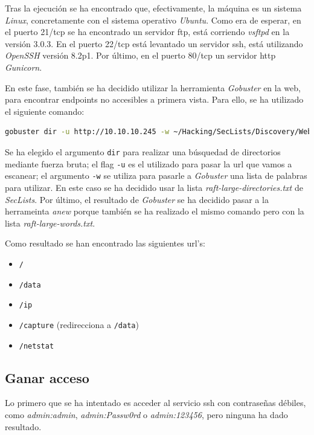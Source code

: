 Tras la ejecución se ha encontrado que, efectivamente, la máquina es un sistema \textit{Linux}, concretamente con el sistema operativo \textit{Ubuntu}. Como era de esperar, en el puerto 21/\acrshort{tcp} se ha encontrado un servidor \acrshort{ftp}, está corriendo \textit{vsftpd}\cite{vsftpd} en la versión 3.0.3. En el puerto 22/\acrshort{tcp} está levantado un servidor \acrshort{ssh}, está utilizando \textit{OpenSSH}\cite{openssh} versión 8.2p1. Por último, en el puerto 80/\acrshort{tcp} un servidor \acrshort{http} \textit{Gunicorn}\cite{gunicorn}.

En este fase, también se ha decidido utilizar la herramienta \textit{Gobuster}\cite{gobuster} en la web, para encontrar endpoints no accesibles a primera vista. Para ello, se ha utilizado el siguiente comando:
\begin{lstlisting}[language=bash]
gobuster dir -u http://10.10.10.245 -w ~/Hacking/SecLists/Discovery/Web-Content/raft-large-directories.txt | anew gobuster.txt
\end{lstlisting}
Se ha elegido el argumento \texttt{dir} para realizar una búsquedad de directorios mediante fuerza bruta; el flag \texttt{-u} es el utilizado para pasar la \acrshort{url} que vamos  a escanear; el argumento \texttt{-w} se utiliza para pasarle a \textit{Gobuster} una lista de palabras para utilizar. En este caso se ha decidido usar la lista \textit{raft-large-directories.txt} de \textit{SecLists}\cite{seclists}. Por último, el resultado de \textit{Gobuster} se ha decidido pasar a la herrameinta \textit{anew}\cite{anew} porque también se ha realizado el mismo comando pero con la lista \textit{raft-large-words.txt}.

Como resultado se han encontrado las siguientes \acrshort{url}'s:
\begin{itemize}
    \item \texttt{/}
    \item \texttt{/data}
    \item \texttt{/ip}
    \item \texttt{/capture} (redirecciona a \texttt{/data})
    \item \texttt{/netstat}
\end{itemize}

\subsection{Ganar acceso}

Lo primero que se ha intentado es acceder al servicio \acrshort{ssh} con contraseñas débiles, como \textit{admin:admin}, \textit{admin:Passw0rd} o \textit{admin:123456}, pero ninguna ha dado resultado.

